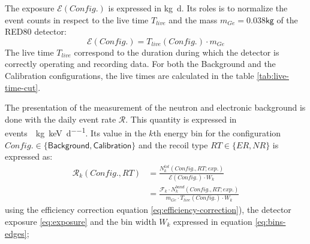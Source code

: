 The exposure $\mathcal{E}(Config.)$ is expressed in \si{\kg \day}. Its roles is to normalize the event counts in respect to the live time $T_{live}$ and the mass $m_{Ge} = 0.038 \textsf{kg} $ of the RED80 detector:
\begin{equation}
\label{eq:exposure}
\mathcal{E}(Config.) = T_{live} (Config.) \cdot m_{Ge}
\end{equation}
The live time $T_{live}$ correspond to the duration during which the detector is correctly operating and recording data. For both the Background and the Calibration configurations, the live times are calculated in the table \ref{tab:live-time-cut}.


The presentation of the measurement of the neutron and electronic background is done with the daily event rate $\mathcal{R}$. This quantity is expressed in \si{events \per \kg \per \kilo\eV \per \day}. Its value in the $k$th energy bin for the configuration $Config. \in \{ \textsf{Background}, \textsf{Calibration} \}$ and the recoil type $RT \in \{ ER, NR\}$ is expressed as:
\begin{align}
\mathcal{R}_k(Config., RT) 
&=
\frac{ N_k^{tot} (Config., RT; exp.) }{ \mathcal{E} (Config.) \cdot W_k}
\\
&=
\frac{ \mathcal{F}_k \cdot N_k^{band} (Config., RT; exp.) }{ m_{Ge} \cdot T_{live}(Config.) \cdot W_k}
\end{align}
using the efficiency correction equation \ref{eq:efficiency-correction}), the detector exposure \ref{eq:exposure}
and the bin width $W_k$ expressed in equation \ref{eq:bins-edges};

